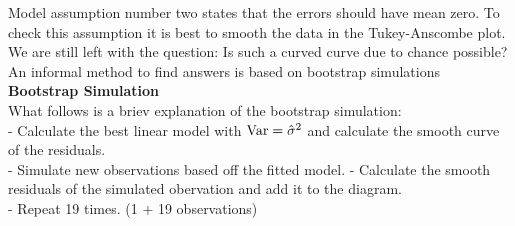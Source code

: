 Model assumption number two states that the errors should have mean zero. To check this assumption it is best to smooth the data in the
Tukey-Anscombe plot. We are still left with the question: Is such a curved curve due to chance possible? An informal method to find answers is based on bootstrap simulations\\

\textbf{Bootstrap Simulation}\\
What follows is a briev explanation of the bootstrap simulation:\\
- Calculate the best linear model with $\textup{Var} = \hat{\sigma}^2$ and calculate the smooth curve of the residuals.\\
- Simulate new observations based off the fitted model.
- Calculate the smooth residuals of the simulated obervation and add it to the diagram.\\
- Repeat 19 times. (1 + 19 observations)
